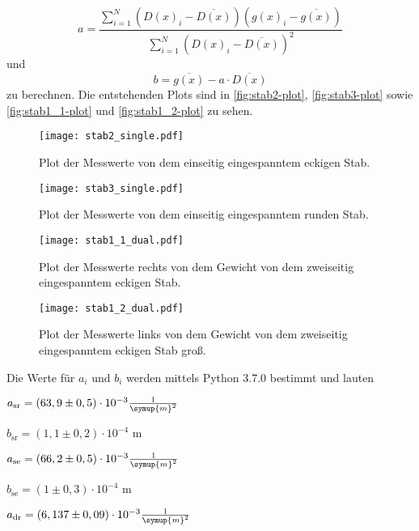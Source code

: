 

\begin{equation}
\label{eqn:a}
  a = \frac {\sum_{i=1}^N (D(x)_i - \overline{D(x)}) (g(x)_i - \overline{g(x)})}{\sum_{i=1}^N (D(x)_i - \overline{D(x)})^2}
\end{equation}
und
\begin{equation}
\label{eqn:b}
  b = \overline{g(x)} - a \cdot \overline{D(x)}
\end{equation}
zu berechnen.
Die entstehenden Plots sind in \autoref{fig:stab2-plot}, \autoref{fig:stab3-plot} sowie \autoref{fig:stab1_1-plot} und \autoref{fig:stab1_2-plot} zu sehen.

\begin{figure}
  \centering
  \texttt{[image: stab2\_single.pdf]}
  \caption{Plot der Messwerte von dem einseitig eingespanntem eckigen Stab.}
  \label{fig:stab2-plot}
\end{figure}

\begin{figure}
  \centering
  \texttt{[image: stab3\_single.pdf]}
  \caption{Plot der Messwerte von dem einseitig eingespanntem runden Stab.}
  \label{fig:stab3-plot}
\end{figure}

\begin{figure}
  \centering
  \texttt{[image: stab1\_1\_dual.pdf]}
  \caption{Plot der Messwerte rechts von dem Gewicht von dem zweiseitig eingespanntem eckigen Stab.}
  \label{fig:stab1_1-plot}
\end{figure}

\begin{figure}
  \centering
  \texttt{[image: stab1\_2\_dual.pdf]}
  \caption{Plot der Messwerte links von dem Gewicht von dem zweiseitig eingespanntem eckigen Stab groß.}
  \label{fig:stab1_2-plot}
\end{figure}

Die Werte für $a_i$ und $b_i$ werden mittels Python 3.7.0 bestimmt und lauten

\vspace{1em}
\centerline{$a_\text{sr} = (63,9 \pm 0,5) \cdot 10^{-3} \frac{1}{\symup{m}^2}$}

\centerline{$b_\text{sr} = (1,1 \pm 0,2) \cdot 10^{-4} $ m}
\vspace{1em}
\centerline{$a_\text{se} = (66,2 \pm 0,5) \cdot 10^{-3} \frac{1}{\symup{m}^2}$}

\centerline{$b_\text{se} = (1 \pm 0,3) \cdot 10^{-4} $ m}
\vspace{1em}
\centerline{$a_\text{dr} = (6,137 \pm 0,09) \cdot 10^{-3} \frac{1}{\symup{m}^2} $}


